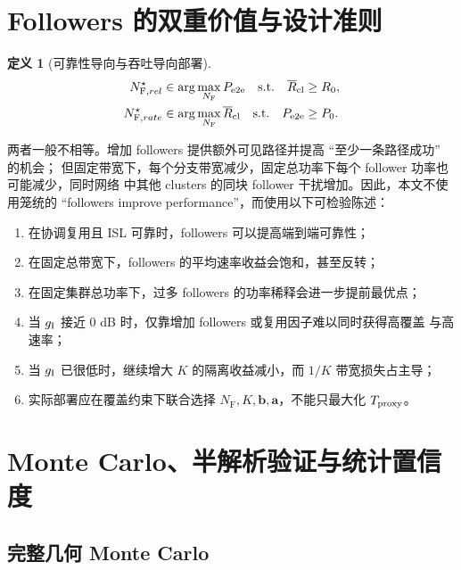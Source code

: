 \documentclass[UTF8,a4paper,11pt]{ctexart}
\newtheorem{definition}{定义}[section]
\newcommand{\NF}{N_{\mathrm F}}
\newcommand{\Pe}{P_{\mathrm{e2e}}}
\newcommand{\Rbar}{\overline R}
\newcommand{\bvec}{\bm b}
\newcommand{\avec}{\bm a}
\begin{document}
\section{Followers 的双重价值与设计准则}

\begin{definition}[可靠性导向与吞吐导向部署]
\begin{align}
 N_{\mathrm F,rel}^{\star}
 &\in\arg\max_{\NF}\Pe
 \quad\text{s.t.}\quad \Rbar_{\rm cl}\geq R_0,
 \label{eq:rel-deployment}\\
 N_{\mathrm F,rate}^{\star}
 &\in\arg\max_{\NF}\Rbar_{\rm cl}
 \quad\text{s.t.}\quad \Pe\geq P_0.
 \label{eq:rate-deployment}
\end{align}
\end{definition}

两者一般不相等。增加 followers 提供额外可见路径并提高 ``至少一条路径成功'' 的机会；
但固定带宽下，每个分支带宽减少，固定总功率下每个 follower 功率也可能减少，同时网络
中其他 clusters 的同块 follower 干扰增加。因此，本文不使用笼统的
``followers improve performance''，而使用以下可检验陈述：
\begin{enumerate}[leftmargin=2em]
  \item 在协调复用且 ISL 可靠时，followers 可以提高端到端可靠性；
  \item 在固定总带宽下，followers 的平均速率收益会饱和，甚至反转；
  \item 在固定集群总功率下，过多 followers 的功率稀释会进一步提前最优点；
  \item 当 $g_{\rm I}$ 接近 $0$ dB 时，仅靠增加 followers 或复用因子难以同时获得高覆盖
  与高速率；
  \item 当 $g_{\rm I}$ 已很低时，继续增大 $K$ 的隔离收益减小，而 $1/K$ 带宽损失占主导；
  \item 实际部署应在覆盖约束下联合选择 $\NF,K,\bvec,\avec$，不能只最大化
  $T_{\rm proxy}$。
\end{enumerate}

\section{Monte Carlo、半解析验证与统计置信度}

\subsection{完整几何 Monte Carlo}
\end{document}
